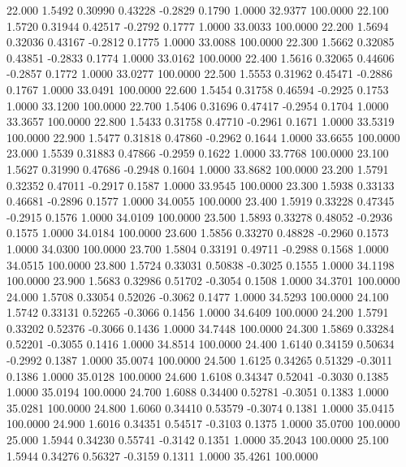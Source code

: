   22.000   1.5492   0.30990   0.43228  -0.2829   0.1790   1.0000  32.9377 100.0000
  22.100   1.5720   0.31944   0.42517  -0.2792   0.1777   1.0000  33.0033 100.0000
  22.200   1.5694   0.32036   0.43167  -0.2812   0.1775   1.0000  33.0088 100.0000
  22.300   1.5662   0.32085   0.43851  -0.2833   0.1774   1.0000  33.0162 100.0000
  22.400   1.5616   0.32065   0.44606  -0.2857   0.1772   1.0000  33.0277 100.0000
  22.500   1.5553   0.31962   0.45471  -0.2886   0.1767   1.0000  33.0491 100.0000
  22.600   1.5454   0.31758   0.46594  -0.2925   0.1753   1.0000  33.1200 100.0000
  22.700   1.5406   0.31696   0.47417  -0.2954   0.1704   1.0000  33.3657 100.0000
  22.800   1.5433   0.31758   0.47710  -0.2961   0.1671   1.0000  33.5319 100.0000
  22.900   1.5477   0.31818   0.47860  -0.2962   0.1644   1.0000  33.6655 100.0000
  23.000   1.5539   0.31883   0.47866  -0.2959   0.1622   1.0000  33.7768 100.0000
  23.100   1.5627   0.31990   0.47686  -0.2948   0.1604   1.0000  33.8682 100.0000
  23.200   1.5791   0.32352   0.47011  -0.2917   0.1587   1.0000  33.9545 100.0000
  23.300   1.5938   0.33133   0.46681  -0.2896   0.1577   1.0000  34.0055 100.0000
  23.400   1.5919   0.33228   0.47345  -0.2915   0.1576   1.0000  34.0109 100.0000
  23.500   1.5893   0.33278   0.48052  -0.2936   0.1575   1.0000  34.0184 100.0000
  23.600   1.5856   0.33270   0.48828  -0.2960   0.1573   1.0000  34.0300 100.0000
  23.700   1.5804   0.33191   0.49711  -0.2988   0.1568   1.0000  34.0515 100.0000
  23.800   1.5724   0.33031   0.50838  -0.3025   0.1555   1.0000  34.1198 100.0000
  23.900   1.5683   0.32986   0.51702  -0.3054   0.1508   1.0000  34.3701 100.0000
  24.000   1.5708   0.33054   0.52026  -0.3062   0.1477   1.0000  34.5293 100.0000
  24.100   1.5742   0.33131   0.52265  -0.3066   0.1456   1.0000  34.6409 100.0000
  24.200   1.5791   0.33202   0.52376  -0.3066   0.1436   1.0000  34.7448 100.0000
  24.300   1.5869   0.33284   0.52201  -0.3055   0.1416   1.0000  34.8514 100.0000
  24.400   1.6140   0.34159   0.50634  -0.2992   0.1387   1.0000  35.0074 100.0000
  24.500   1.6125   0.34265   0.51329  -0.3011   0.1386   1.0000  35.0128 100.0000
  24.600   1.6108   0.34347   0.52041  -0.3030   0.1385   1.0000  35.0194 100.0000
  24.700   1.6088   0.34400   0.52781  -0.3051   0.1383   1.0000  35.0281 100.0000
  24.800   1.6060   0.34410   0.53579  -0.3074   0.1381   1.0000  35.0415 100.0000
  24.900   1.6016   0.34351   0.54517  -0.3103   0.1375   1.0000  35.0700 100.0000
  25.000   1.5944   0.34230   0.55741  -0.3142   0.1351   1.0000  35.2043 100.0000
  25.100   1.5944   0.34276   0.56327  -0.3159   0.1311   1.0000  35.4261 100.0000
